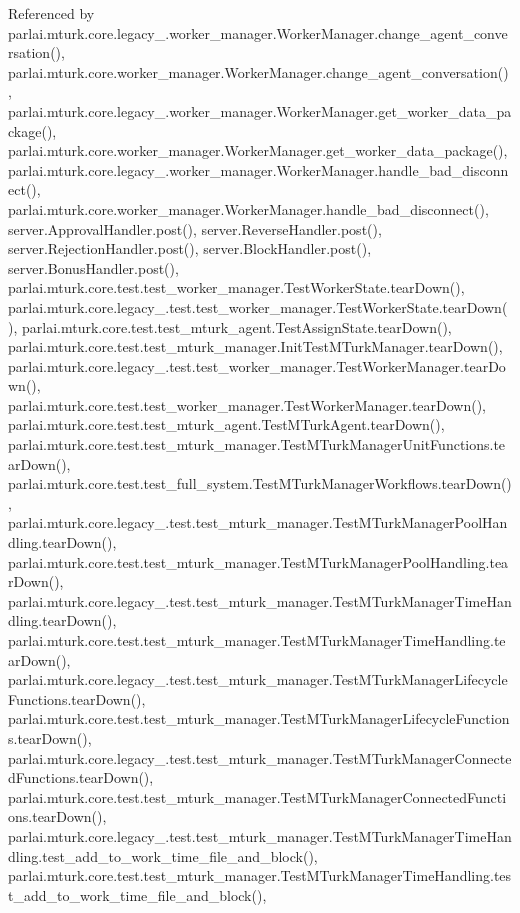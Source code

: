 Referenced by parlai.\+mturk.\+core.\+legacy\+\_.\+worker\+\_\+manager.\+Worker\+Manager.\+change\+\_\+agent\+\_\+conversation(), parlai.\+mturk.\+core.\+worker\+\_\+manager.\+Worker\+Manager.\+change\+\_\+agent\+\_\+conversation(), parlai.\+mturk.\+core.\+legacy\+\_.\+worker\+\_\+manager.\+Worker\+Manager.\+get\+\_\+worker\+\_\+data\+\_\+package(), parlai.\+mturk.\+core.\+worker\+\_\+manager.\+Worker\+Manager.\+get\+\_\+worker\+\_\+data\+\_\+package(), parlai.\+mturk.\+core.\+legacy\+\_.\+worker\+\_\+manager.\+Worker\+Manager.\+handle\+\_\+bad\+\_\+disconnect(), parlai.\+mturk.\+core.\+worker\+\_\+manager.\+Worker\+Manager.\+handle\+\_\+bad\+\_\+disconnect(), server.\+Approval\+Handler.\+post(), server.\+Reverse\+Handler.\+post(), server.\+Rejection\+Handler.\+post(), server.\+Block\+Handler.\+post(), server.\+Bonus\+Handler.\+post(), parlai.\+mturk.\+core.\+test.\+test\+\_\+worker\+\_\+manager.\+Test\+Worker\+State.\+tear\+Down(), parlai.\+mturk.\+core.\+legacy\+\_.\+test.\+test\+\_\+worker\+\_\+manager.\+Test\+Worker\+State.\+tear\+Down(), parlai.\+mturk.\+core.\+test.\+test\+\_\+mturk\+\_\+agent.\+Test\+Assign\+State.\+tear\+Down(), parlai.\+mturk.\+core.\+test.\+test\+\_\+mturk\+\_\+manager.\+Init\+Test\+M\+Turk\+Manager.\+tear\+Down(), parlai.\+mturk.\+core.\+legacy\+\_.\+test.\+test\+\_\+worker\+\_\+manager.\+Test\+Worker\+Manager.\+tear\+Down(), parlai.\+mturk.\+core.\+test.\+test\+\_\+worker\+\_\+manager.\+Test\+Worker\+Manager.\+tear\+Down(), parlai.\+mturk.\+core.\+test.\+test\+\_\+mturk\+\_\+agent.\+Test\+M\+Turk\+Agent.\+tear\+Down(), parlai.\+mturk.\+core.\+test.\+test\+\_\+mturk\+\_\+manager.\+Test\+M\+Turk\+Manager\+Unit\+Functions.\+tear\+Down(), parlai.\+mturk.\+core.\+test.\+test\+\_\+full\+\_\+system.\+Test\+M\+Turk\+Manager\+Workflows.\+tear\+Down(), parlai.\+mturk.\+core.\+legacy\+\_.\+test.\+test\+\_\+mturk\+\_\+manager.\+Test\+M\+Turk\+Manager\+Pool\+Handling.\+tear\+Down(), parlai.\+mturk.\+core.\+test.\+test\+\_\+mturk\+\_\+manager.\+Test\+M\+Turk\+Manager\+Pool\+Handling.\+tear\+Down(), parlai.\+mturk.\+core.\+legacy\+\_.\+test.\+test\+\_\+mturk\+\_\+manager.\+Test\+M\+Turk\+Manager\+Time\+Handling.\+tear\+Down(), parlai.\+mturk.\+core.\+test.\+test\+\_\+mturk\+\_\+manager.\+Test\+M\+Turk\+Manager\+Time\+Handling.\+tear\+Down(), parlai.\+mturk.\+core.\+legacy\+\_.\+test.\+test\+\_\+mturk\+\_\+manager.\+Test\+M\+Turk\+Manager\+Lifecycle\+Functions.\+tear\+Down(), parlai.\+mturk.\+core.\+test.\+test\+\_\+mturk\+\_\+manager.\+Test\+M\+Turk\+Manager\+Lifecycle\+Functions.\+tear\+Down(), parlai.\+mturk.\+core.\+legacy\+\_.\+test.\+test\+\_\+mturk\+\_\+manager.\+Test\+M\+Turk\+Manager\+Connected\+Functions.\+tear\+Down(), parlai.\+mturk.\+core.\+test.\+test\+\_\+mturk\+\_\+manager.\+Test\+M\+Turk\+Manager\+Connected\+Functions.\+tear\+Down(), parlai.\+mturk.\+core.\+legacy\+\_.\+test.\+test\+\_\+mturk\+\_\+manager.\+Test\+M\+Turk\+Manager\+Time\+Handling.\+test\+\_\+add\+\_\+to\+\_\+work\+\_\+time\+\_\+file\+\_\+and\+\_\+block(), parlai.\+mturk.\+core.\+test.\+test\+\_\+mturk\+\_\+manager.\+Test\+M\+Turk\+Manager\+Time\+Handling.\+test\+\_\+add\+\_\+to\+\_\+work\+\_\+time\+\_\+file\+\_\+and\+\_\+block(), 